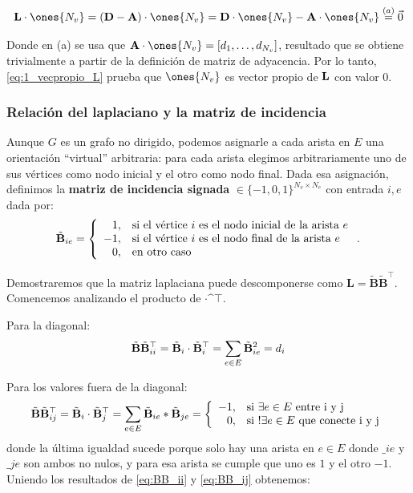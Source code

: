 \documentclass{article}
\begin{document}
\begin{equation}
    \lap \cdot \ones{N_v} = (\diag - \adj) \cdot \ones{N_v}  = \diag \cdot \ones{N_v} - \adj \cdot \ones{N_v} \stackrel{(a)}{=} \vec{0}
    \label{eq:1_vecpropio_L}
\end{equation}

Donde en (a) se usa que $\adj \cdot \ones{N_v} = [d_1, \dots, d_{N_v}]$, resultado que
se obtiene trivialmente a partir de la definición de matriz de adyacencia.
Por lo tanto, \eqref{eq:1_vecpropio_L} prueba que $\ones{N_v}$ es vector propio de $\mathbf{L}$ con valor 0.

\subsubsection{Relación del laplaciano y la matriz de incidencia}

Aunque $G$ es un grafo no dirigido, podemos asignarle a cada arista en $E$ una orientación ``virtual'' arbitraria: para cada arista elegimos arbitrariamente uno de sus vértices como nodo inicial y el otro como nodo final. Dada esa asignación, definimos la \textbf{matriz de incidencia signada} $\bm \in \{-1,0,1\}^{N_v\times N_e}$ con entrada $i,e$ dada por:
\begin{equation}
    \tilde{\mathbf{B}}_{ie} = \left\lbrace
    \begin{array}{r l}
        1,  & \text{si el vértice } i \text{ es el nodo inicial de la arista } e \\
        -1, & \text{si el vértice } i \text{ es el nodo final de la arista } e   \\
        0,  & \text{en otro caso}
    \end{array}
    \right. .
    \label{eq:matrix_incidencia}
\end{equation}

Demostraremos que la matriz laplaciana puede descomponerse como $\mathbf{L}=\tilde{\mathbf{B}}\tilde{\mathbf{B}}^\top$. Comencemos analizando el producto de $\bm\cdot\bm^\top$.

Para la diagonal:
\begin{equation}
    \label{eq:BB_ii}
    \tilde{\mathbf{B}}\tilde{\mathbf{B}}^\top_{ii} = \tilde{\mathbf{B}}_i \cdot \tilde{\mathbf{B}}_i^\top = \sum_{e\in E} \tilde{\mathbf{B}}_{ie}^2 = d_i
\end{equation}

Para los valores fuera de la diagonal:
\begin{equation}
    \label{eq:BB_ij}
    \tilde{\mathbf{B}}\tilde{\mathbf{B}}^\top_{ij} = \tilde{\mathbf{B}}_i\cdot\tilde{\mathbf{B}}_j^\top = \sum_{e\in E} \tilde{\mathbf{B}}_{ie} * \tilde{\mathbf{B}}_{je} = \left\lbrace
    \begin{array}{r l}
        -1, & \text{si $\exists e\in E$ entre i y j}         \\
        0,  & \text{si $!\exists e \in E$ que conecte i y j}
    \end{array}
    \right.
\end{equation}
donde la última igualdad sucede porque solo hay una arista en $e \in E$ donde
$\bm_{ie}$ y $\bm_{je}$ son ambos no nulos, y para esa arista se cumple que uno es
$1$ y el otro $-1$. Uniendo los resultados de \eqref{eq:BB_ii} y \eqref{eq:BB_ij} obtenemos:
\end{document}

